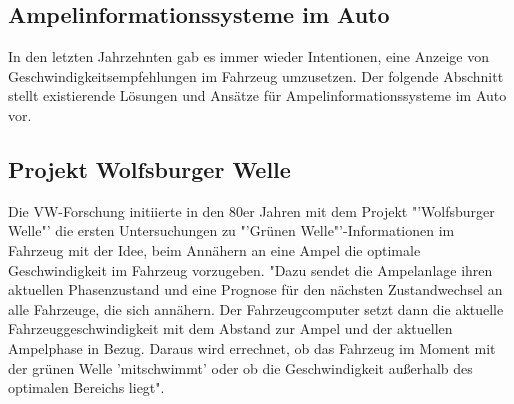 \subsection{Ampelinformationssysteme im Auto}
In den letzten Jahrzehnten gab es immer wieder Intentionen, eine Anzeige von Geschwindigkeitsempfehlungen im Fahrzeug umzusetzen. Der folgende Abschnitt stellt existierende Lösungen und Ansätze für Ampelinformationssysteme im Auto vor.
\subsection*{Projekt Wolfsburger Welle}
Die VW-Forschung initiierte in den 80er Jahren mit dem Projekt "'Wolfsburger Welle"' die ersten Untersuchungen zu "'Grünen Welle"'-Informationen im Fahrzeug mit der Idee, beim Annähern an eine Ampel die optimale Geschwindigkeit im Fahrzeug vorzugeben.\cite{Welle} "Dazu sendet die Ampelanlage ihren aktuellen Phasenzustand und eine Prognose für den nächsten Zustandwechsel an alle Fahrzeuge, die sich annähern. Der Fahrzeugcomputer setzt dann die aktuelle Fahrzeuggeschwindigkeit mit dem Abstand zur Ampel und der aktuellen Ampelphase in Bezug. Daraus wird errechnet, ob das Fahrzeug im Moment mit der grünen Welle ’mitschwimmt’ oder ob die Geschwindigkeit außerhalb des optimalen Bereichs liegt". \cite{MenschMaschine}
